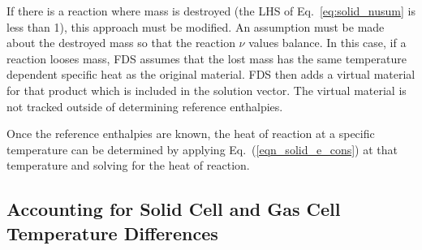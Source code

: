 If there is a reaction where mass is destroyed (the LHS of Eq.~\eqref{eq:solid_nusum} is less than 1), this approach must be modified. An assumption must be made about the destroyed mass so that the reaction $\nu$ values balance. In this case, if a reaction looses mass, FDS assumes that the lost mass has the same temperature dependent specific heat as the original material. FDS then adds a virtual material for that product which is included in the solution vector. The virtual material is not tracked outside of determining reference enthalpies.

Once the reference enthalpies are known, the heat of reaction at a specific temperature can be determined by applying Eq.~(\ref{eqn_solid_e_cons}) at that temperature and solving for the heat of reaction.

\subsection{Accounting for Solid Cell and Gas Cell Temperature Differences}

